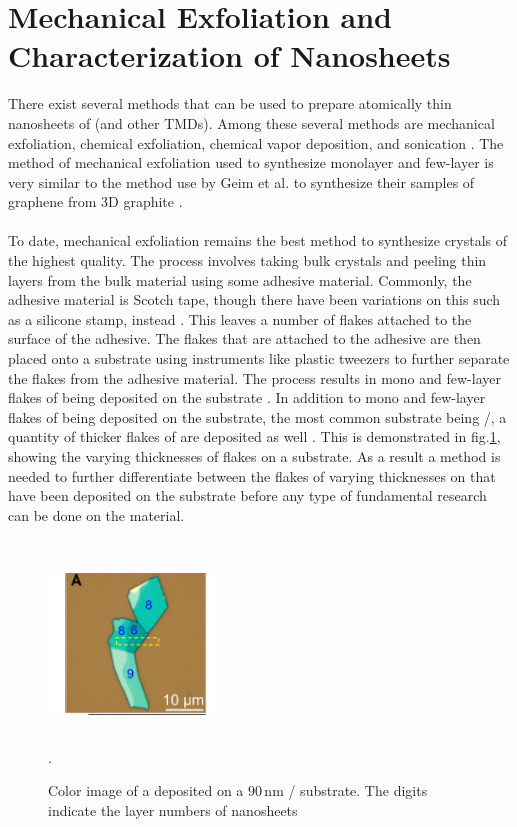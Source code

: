 \documentclass[%
 reprint,
 amsmath,amssymb,
 aps,
pra,
floatfix,
]{revtex4-1}
\begin{document}
\section{\label{sec:synthesis_methods} Mechanical Exfoliation and Characterization of  Nanosheets}
There exist several methods that can be used to prepare atomically thin nanosheets of  (and other TMDs). Among these several methods are mechanical exfoliation, chemical exfoliation, chemical vapor deposition, and sonication \cite{grapheneLike2Dreview2013}. The method of mechanical exfoliation used to synthesize monolayer and few-layer  is very similar to the method use by Geim et al. to synthesize their samples of graphene from 3D graphite \cite{novoselovEtAl2005}. 
\\ \\
To date, mechanical exfoliation remains the best method to synthesize  crystals of the highest quality. The process involves taking bulk  crystals and peeling thin layers from the bulk material using some adhesive material. Commonly, the adhesive material is Scotch tape, though there have been variations on this such as a silicone stamp, instead \cite{Gomez2010}. This leaves a number of flakes attached to the surface of the adhesive. The flakes that are attached to the adhesive are then placed onto a substrate using instruments like plastic tweezers to further separate the flakes from the adhesive material. The process results in mono and few-layer flakes of  being deposited on the substrate \cite{Li2014}. In addition to mono and few-layer flakes of  being deposited on the substrate, the most common substrate being /, a quantity of thicker flakes of  are deposited as well \cite{acsnanoReview2013}. This is demonstrated in fig.\ref{fig:exfoliation}, showing the varying thicknesses of  flakes on a substrate. As a result a method is needed to further differentiate between the flakes of varying thicknesses on that have been deposited on the substrate before any type of fundamental research can be done on the material. \\ \\
\begin{figure}
\includegraphics[height=4.5cm, width=4.5cm]{../figs/exfoliation}
\caption{Color image of a  deposited on a $90 \mathrm{\,nm}$ / substrate. The digits indicate the layer numbers of  nanosheets \cite{Li2014}}.
\label{fig:exfoliation}
\end{figure}
\end{document}
